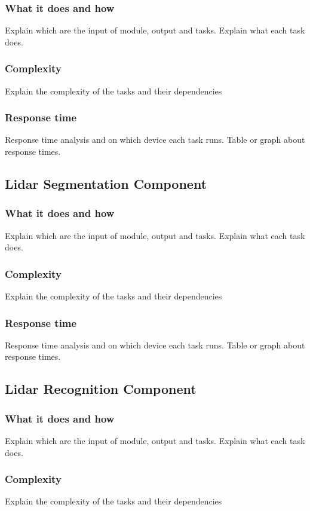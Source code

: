 \documentclass[conference]{IEEEtran}
\begin{document}
\subsubsection{What it does and how}
Explain which are the input of module, output and tasks.
Explain what each task does.
\subsubsection{Complexity}
Explain the complexity of the tasks and their dependencies
\subsubsection{Response time}
Response time analysis and on which device each task runs.
Table or graph about response times.

\subsection{Lidar Segmentation Component}

\subsubsection{What it does and how}
Explain which are the input of module, output and tasks.
Explain what each task does.
\subsubsection{Complexity}
Explain the complexity of the tasks and their dependencies
\subsubsection{Response time}
Response time analysis and on which device each task runs.
Table or graph about response times.

\subsection{Lidar Recognition Component}

\subsubsection{What it does and how}
Explain which are the input of module, output and tasks.
Explain what each task does.
\subsubsection{Complexity}
Explain the complexity of the tasks and their dependencies
\end{document}
